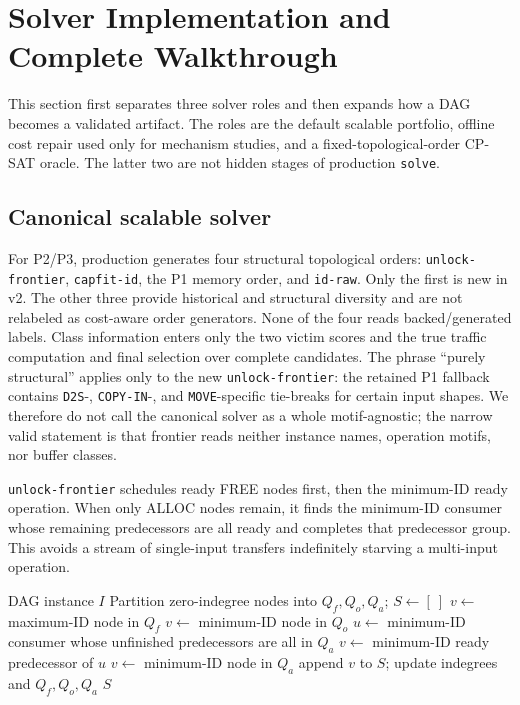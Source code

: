\section{Solver Implementation and Complete Walkthrough}\label{sec:supp-solution}

This section first separates three solver roles and then expands how a DAG becomes a validated artifact. The roles are the default scalable portfolio, offline cost repair used only for mechanism studies, and a fixed-topological-order CP-SAT oracle. The latter two are not hidden stages of production \texttt{solve}.

\subsection{Canonical scalable solver}

For P2/P3, production generates four structural topological orders: \texttt{unlock-frontier}, \texttt{capfit-id}, the P1 memory order, and \texttt{id-raw}. Only the first is new in v2. The other three provide historical and structural diversity and are not relabeled as cost-aware order generators. None of the four reads backed/generated labels. Class information enters only the two victim scores and the true traffic computation and final selection over complete candidates. The phrase ``purely structural'' applies only to the new \texttt{unlock-frontier}: the retained P1 fallback contains \texttt{D2S}-, \texttt{COPY-IN}-, and \texttt{MOVE}-specific tie-breaks for certain input shapes. We therefore do not call the canonical solver as a whole motif-agnostic; the narrow valid statement is that frontier reads neither instance names, operation motifs, nor buffer classes.

\texttt{unlock-frontier} schedules ready FREE nodes first, then the minimum-ID ready operation. When only ALLOC nodes remain, it finds the minimum-ID consumer whose remaining predecessors are all ready and completes that predecessor group. This avoids a stream of single-input transfers indefinitely starving a multi-input operation.

\begin{algorithm}[H]
\caption{Dependency-frontier topological order}\label{alg:supp-frontier}
\begin{algorithmic}[1]
\Require DAG instance $I$
\State Partition zero-indegree nodes into $Q_f,Q_o,Q_a$; $S\gets[\ ]$
   \State $v\gets$ maximum-ID node in $Q_f$
   \State $v\gets$ minimum-ID node in $Q_o$
  \Else
    \State $u\gets$ minimum-ID consumer whose unfinished predecessors are all in $Q_a$
    \State $v\gets$ minimum-ID ready predecessor of $u$
     \State $v\gets$ minimum-ID node in $Q_a$ \EndIf
  \EndIf
  \State append $v$ to $S$; update indegrees and $Q_f,Q_o,Q_a$
\EndWhile
\State \Return $S$
\end{algorithmic}
\end{algorithm}

